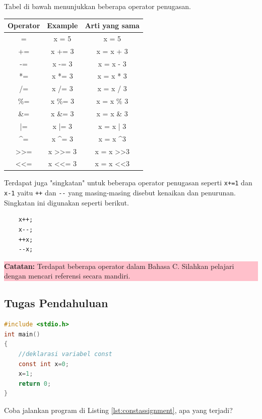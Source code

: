 Tabel di bawah menunjukkan beberapa operator penugasan.
\begin{center}
	\begin{tabular}{|c|c|c|}
		\hline
		\multicolumn{1}{|l|}{Operator} & \multicolumn{1}{l|}{Example}       & \multicolumn{1}{l|}{Arti yang sama}  \\ \hline
		=   & x = 5   & x = 5      \\ \hline
		+=  & x += 3  & x = x + 3  \\ \hline
		-=  & x -= 3  & x = x - 3  \\ \hline
		*=  & x *= 3  & x = x * 3  \\ \hline
		/=  & x /= 3  & x = x / 3  \\ \hline
		\%= & x \%= 3 & x = x \% 3 \\ \hline
		\&= & x \&= 3 & x = x \& 3 \\ \hline
		|=  & x |= 3  & x = x | 3  \\ \hline
		\textasciicircum{}=            & x \textasciicircum{}= 3           & x = x \textasciicircum 3           \\ \hline
		\textgreater{}\textgreater{}=  & x \textgreater{}\textgreater{}= 3 & x = x \textgreater{}\textgreater 3 \\ \hline
		\textless{}\textless{}=        & x \textless{}\textless{}= 3       & x = x \textless{}\textless 3       \\ \hline
	\end{tabular}
\end{center}
Terdapat juga "singkatan" untuk beberapa operator penugasan seperti \verb*|x+=1| dan \verb*|x-1| yaitu \verb*|++| dan \verb*|--| yang masing-masing disebut kenaikan dan penurunan.
Singkatan ini digunakan seperti berikut.
\begin{verbatim}
    x++;
    x--;
    ++x;
    --x;
\end{verbatim}

\begin{center}
	\colorbox{pink}{\parbox{0.8\linewidth}{\textbf{Catatan:} Terdapat beberapa operator dalam Bahasa C. Silahkan pelajari dengan mencari referensi secara mandiri.}}
\end{center}
\subsection{Tugas Pendahuluan}
\begin{lstlisting}[language=c,caption=Menggunakan operator penugasan pada variabel const,label=lst:constassignment,captionpos=t]
#include <stdio.h>
int main()
{
    //deklarasi variabel const
    const int x=0;
    x=1;
	return 0;
}
\end{lstlisting} 
Coba jalankan program di Listing \ref{lst:constassignment}, apa yang terjadi?


